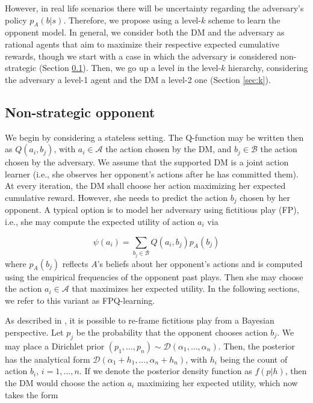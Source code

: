 \documentclass[letterpaper]{article} %
\begin{document}
However, in real life scenarios there will be uncertainty regarding the adversary's policy $p_A (b | s)$. Therefore, we propose using a level-$k$ scheme \cite{rios2009adversarial}
 to learn the opponent model.
In general, we consider both the DM and the adversary
as rational agents that aim to maximize their respective expected cumulative rewards, though we start with a case in which the adversary is considered non-strategic (Section \ref{sec:non}). Then, we go up a level in the level-$k$ hierarchy, considering the adversary a level-1 agent and the DM a level-2 one (Section \ref{sec:k}).


\subsection{Non-strategic opponent}\label{sec:non}


We begin by considering a stateless setting. The Q-function may be written then
as $Q(a_i,b_j)$, with $a_i \in \mathcal{A}$ the action chosen by the DM, and $b_j \in \mathcal{B}$ the action chosen by the adversary. We assume that the supported DM is a joint action learner (i.e., she observes her opponent's actions after he has committed them). At every iteration, the DM shall choose her action maximizing her expected cumulative reward. However, she needs to predict the action $b_j$ chosen by her opponent. A typical option is to model her adversary using fictitious play (FP), i.e., she may compute the expected utility of action $a_i$ via

\[ \psi(a_i) = \sum_{b_j \in \mathcal{B}} Q(a_i, b_j) p_{A}(b_j) \]
where $p_A (b_j)$ reflects $A$'s beliefs about her opponent's actions and is computed using the empirical frequencies of the opponent past plays.
Then she may choose the action $a_i \in \mathcal{A}$ that
maximizes her expected utility. In the following sections, we refer to this variant as FPQ-learning.

As described in \cite{rios1}, it is possible to re-frame fictitious play from a Bayesian perspective. Let $p_j$ be the probability that the opponent chooses action $b_j$. We may place a Dirichlet prior $(p_1 , \ldots, p_n) \sim \mathcal{D}(\alpha_1,\ldots,\alpha_n)$. Then, the posterior has the analytical form $\mathcal{D}(\alpha_1 + h_1,\ldots,\alpha_n + h_n)$, with  $h_i$ being the count of action $b_i$, $i=1,...,n$. If we denote the posterior density function as $f(p|h)$, then the DM would choose the action $a_i$ maximizing her expected utility, which now takes the form
\end{document}
